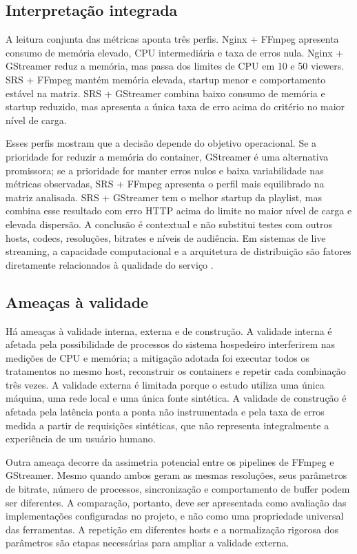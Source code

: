 \subsection{Interpretação integrada}

A leitura conjunta das métricas aponta três perfis. Nginx + FFmpeg apresenta consumo de memória elevado, CPU intermediária e taxa de erros nula. Nginx + GStreamer reduz a memória, mas passa dos limites de CPU em 10 e 50 viewers. SRS + FFmpeg mantém memória elevada, startup menor e comportamento estável na matriz. SRS + GStreamer combina baixo consumo de memória e startup reduzido, mas apresenta a única taxa de erro acima do critério no maior nível de carga.

Esses perfis mostram que a decisão depende do objetivo operacional. Se a prioridade for reduzir a memória do container, GStreamer é uma alternativa promissora; se a prioridade for manter erros nulos e baixa variabilidade nas métricas observadas, SRS + FFmpeg apresenta o perfil mais equilibrado na matriz analisada. SRS + GStreamer tem o melhor startup da playlist, mas combina esse resultado com erro HTTP acima do limite no maior nível de carga e elevada dispersão. A conclusão é contextual e não substitui testes com outros hosts, codecs, resoluções, bitrates e níveis de audiência. Em sistemas de live streaming, a capacidade computacional e a arquitetura de distribuição são fatores diretamente relacionados à qualidade do serviço \citep{dao}.

\subsection{Ameaças à validade}

Há ameaças à validade interna, externa e de construção. A validade interna é afetada pela possibilidade de processos do sistema hospedeiro interferirem nas medições de CPU e memória; a mitigação adotada foi executar todos os tratamentos no mesmo host, reconstruir os containers e repetir cada combinação três vezes. A validade externa é limitada porque o estudo utiliza uma única máquina, uma rede local e uma única fonte sintética. A validade de construção é afetada pela latência ponta a ponta não instrumentada e pela taxa de erros medida a partir de requisições sintéticas, que não representa integralmente a experiência de um usuário humano.

Outra ameaça decorre da assimetria potencial entre os pipelines de FFmpeg e GStreamer. Mesmo quando ambos geram as mesmas resoluções, seus parâmetros de bitrate, número de processos, sincronização e comportamento de buffer podem ser diferentes. A comparação, portanto, deve ser apresentada como avaliação das implementações configuradas no projeto, e não como uma propriedade universal das ferramentas. A repetição em diferentes hosts e a normalização rigorosa dos parâmetros são etapas necessárias para ampliar a validade externa.

